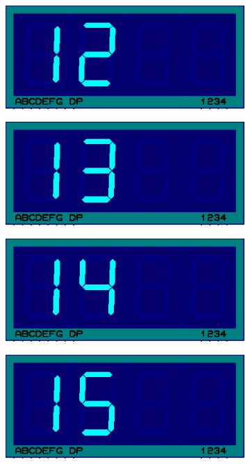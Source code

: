 \documentclass{lab_sheet}
\begin{document}
\begin{figure}[H]
\begin{subfigure}{.33\textwidth}
          \centering
          \includegraphics[frame,width=.9\linewidth]{../Figures/d12}   
          \caption{}
          \label{fig:prob2-m}
        \end{subfigure}
        \begin{subfigure}{.33\textwidth}
          \centering
          \includegraphics[frame,width=.9\linewidth]{../Figures/d13}   
          \caption{}
          \label{fig:prob2-n}
        \end{subfigure}
        \begin{subfigure}{.33\textwidth}
          \centering
          \includegraphics[frame,width=.9\linewidth]{../Figures/d14}   
          \caption{}
          \label{fig:prob2-o}
        \end{subfigure}
        \newline
        \begin{subfigure}{.33\textwidth}
          \centering
          \includegraphics[frame,width=.9\linewidth]{../Figures/d15}   

\end{subfigure}
\end{figure}
\end{document}
